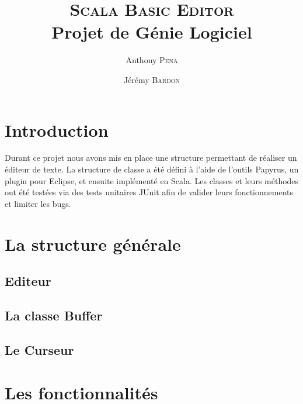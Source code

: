 \documentclass[french]{article}
\author{Anthony \textsc{Pena} \and Jérémy \textsc{Bardon}}
\title{\textsc{Scala Basic Editor}\\\normalsize{Projet de Génie Logiciel}}
\date{}
\begin{document}
\maketitle

\renewcommand\contentsname{Sommaire}
\tableofcontents



\section{Introduction}

Durant ce projet nous avons mis en place une structure permettant de réaliser un éditeur de texte. La structure de classe a été défini à l'aide de l'outils Papyrus, un plugin pour Eclipse, et ensuite implémenté en Scala. Les classes et leurs méthodes ont été testées via des tests unitaires JUnit afin de valider leurs fonctionnements et limiter les bugs.

\section{La structure générale}

\subsection{Editeur}

\subsection{La classe Buffer}

\subsection{Le Curseur}

\section{Les fonctionnalités}

\end{document}

